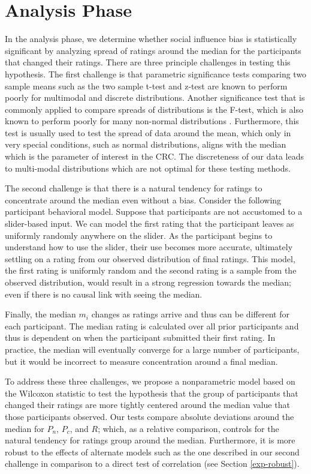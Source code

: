 \section{Analysis Phase}\label{ht}
In the analysis phase, we determine whether social influence bias is statistically significant by analyzing spread of ratings around the median for the participants that changed their ratings.
There are three principle challenges in testing this hypothesis.
The first challenge is that parametric significance tests comparing two sample means such as the two sample t-test and z-test are known to 
perform poorly for multimodal and discrete distributions.
Another significance test that is commonly applied to compare spreads of distributions is the F-test, which is also known to perform poorly for many non-normal distributions \cite{markowski1990conditions}.
Furthermore, this test is usually used to test the spread of data around the mean, which only in very special conditions, such as normal distributions, aligns with the median which is the parameter of interest in the CRC. 
The discreteness of our data leads to multi-modal distributions which are not optimal for these testing methods.

The second challenge is that there is a natural tendency for ratings to concentrate around the median even without a bias.
Consider the following participant behavioral model.
Suppose that participants are not accustomed to a slider-based input.
We can model the first rating that the participant leaves as uniformly randomly anywhere on the slider.
As the participant begins to understand how to use the slider, their use becomes more accurate, ultimately settling on a rating from our observed distribution of final ratings.
This model, the first rating is uniformly random and the second rating is a sample from the observed distribution, would result in a strong regression towards the median; even if there is no causal link with seeing the median.

Finally, the median $m_i$ changes as ratings arrive and thus can be different for each participant.
The median rating is calculated over all prior participants and thus is dependent on when the participant submitted their first rating.
In practice, the median will eventually converge for a large number of participants, but it would be incorrect to measure concentration around a final median.

To address these three challenges, we propose a nonparametric model based on the Wilcoxon statistic to test the hypothesis that the group of participants that changed their ratings are more tightly centered around the median value that those participants observed.
Our tests compare absolute deviations around the median for $P_n$, $P_c$, and $R$; which, as a relative comparison, controls for the natural tendency for ratings group around the median.
Furthermore, it is more robust to the effects of alternate models such as the one described in our second challenge in comparison to a direct test of correlation (see Section \ref{exp-robust}).

